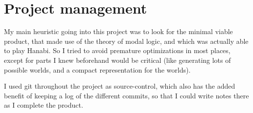 \section{Project management}

My main heuristic going into this project was to look for the minimal viable product, that made use of the theory of modal logic, and which was actually able to play Hanabi. So I tried to avoid premature optimizations in most places, except for parts I knew beforehand would be critical (like generating lots of possible worlds, and a compact representation for the worlds). 

I used git throughout the project as source-control, which also has the added benefit of keeping a log of the different commits, so that I could write notes there as I complete the product.

